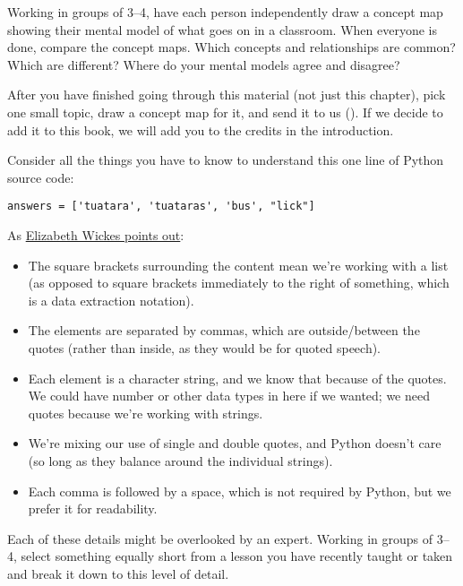 
Working in groups of 3--4, have each person independently draw a
concept map showing their mental model of what goes on in a classroom.
When everyone is done, compare the concept maps.  Which concepts and
relationships are common?  Which are different?  Where do your mental
models agree and disagree?


After you have finished going through this material (not just this
chapter), pick one small topic, draw a concept map for it, and send it
to us ().  If we decide to add it to this book, we
will add you to the credits in the introduction.


Consider all the things you have to know to understand this one line of
Python source code:

\begin{verbatim}
answers = ['tuatara', 'tuataras', 'bus', "lick"]
\end{verbatim}

\noindent
As \href{https://twitter.com/elliewix/status/981285432922202113}{Elizabeth Wickes points out}:

\begin{itemize}

\item
  The square brackets surrounding the content mean we're working with
  a list (as opposed to square brackets immediately to the right of
  something, which is a data extraction notation).

\item
  The elements are separated by commas, which are outside/between the
  quotes (rather than inside, as they would be for quoted speech).

\item
  Each element is a character string, and we know that because of the
  quotes. We could have number or other data types in here if we
  wanted; we need quotes because we're working with strings.

\item
  We're mixing our use of single and double quotes, and Python doesn't
  care (so long as they balance around the individual strings).

\item
  Each comma is followed by a space, which is not required by Python,
  but we prefer it for readability.

\end{itemize}

\noindent
Each of these details might be overlooked by an expert.  Working in
groups of 3--4, select something equally short from a lesson you have
recently taught or taken and break it down to this level of detail.
